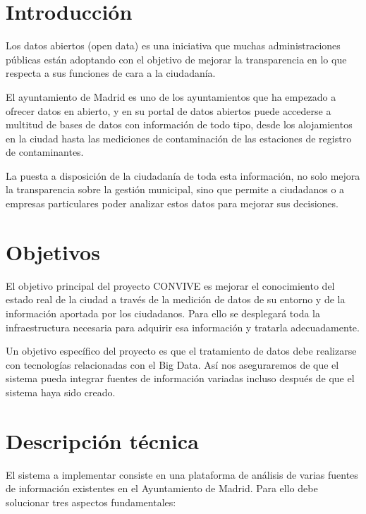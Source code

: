 \documentclass[
  a4paper,
]{scrreport}
\begin{document}
\section{Introducción}\label{introducciuxf3n}

Los datos abiertos (open data) es una iniciativa que muchas
administraciones públicas están adoptando con el objetivo de mejorar la
transparencia en lo que respecta a sus funciones de cara a la
ciudadanía.

El ayuntamiento de Madrid es uno de los ayuntamientos que ha empezado a
ofrecer datos en abierto, y en su portal de datos abiertos puede
accederse a multitud de bases de datos con información de todo tipo,
desde los alojamientos en la ciudad hasta las mediciones de
contaminación de las estaciones de registro de contaminantes.

La puesta a disposición de la ciudadanía de toda esta información, no
solo mejora la transparencia sobre la gestión municipal, sino que
permite a ciudadanos o a empresas particulares poder analizar estos
datos para mejorar sus decisiones.

\section{Objetivos}\label{objetivos}

El objetivo principal del proyecto CONVIVE es mejorar el conocimiento
del estado real de la ciudad a través de la medición de datos de su
entorno y de la información aportada por los ciudadanos. Para ello se
desplegará toda la infraestructura necesaria para adquirir esa
información y tratarla adecuadamente.

Un objetivo específico del proyecto es que el tratamiento de datos debe
realizarse con tecnologías relacionadas con el Big Data. Así nos
aseguraremos de que el sistema pueda integrar fuentes de información
variadas incluso después de que el sistema haya sido creado.

\section{Descripción técnica}\label{descripciuxf3n-tuxe9cnica}

El sistema a implementar consiste en una plataforma de análisis de
varias fuentes de información existentes en el Ayuntamiento de Madrid.
Para ello debe solucionar tres aspectos fundamentales:
\end{document}
